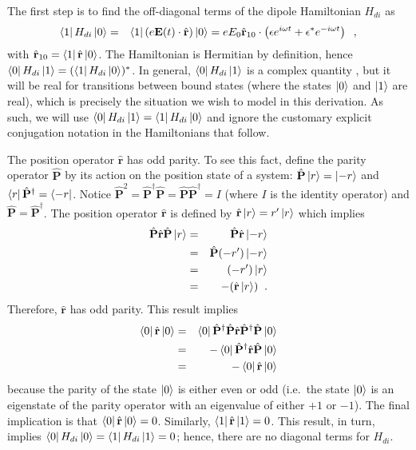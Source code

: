 The first step is to find the off-diagonal terms of the dipole Hamiltonian $H_{di}$ as
\begin{eqnarray*}
\left\langle1\right|H_{di}\left|0\right\rangle &=& \left\langle1\right|\left(e\mathbf{E}(t)\cdot\hat{\mathbf{r}}\right)\left|0\right\rangle = e E_0 \hat{\mathbf{r}}_{10}\cdot\left(\mathbf{\epsilon} e^{i\omega t} + \mathbf{\epsilon}^* e^{-i\omega t}\right)\;\;,
\end{eqnarray*}
with $\hat{\mathbf{r}}_{10} = \left\langle1\right|\hat{\mathbf{r}}\left|0\right\rangle$.  The Hamiltonian is Hermitian by definition, hence $\left\langle0\right|H_{di}\left|1\right\rangle = (\left\langle1\right|H_{di}\left|0\right\rangle)^*$. In general, $\left\langle0\right|H_{di}\left|1\right\rangle$ is a complex quantity \cite{Faisal1987}, but it will be real for transitions between bound states \cite{Loudon2000} (where the states $\left|0\right\rangle$ and $\left|1\right\rangle$ are real), which is precisely the situation we wish to model in this derivation.  As such, we will use $\left\langle0\right|H_{di}\left|1\right\rangle = \left\langle1\right|H_{di}\left|0\right\rangle$ and ignore the customary explicit conjugation notation in the Hamiltonians that follow.

The position operator $\hat{\mathbf{r}}$ has odd parity.  To see this fact, define the parity operator $\hat{\mathbf{P}}$ by its action on the position state of a system: $\hat{\mathbf{P}}\left|r\right\rangle = \left|-r\right\rangle$ and $\left\langle r\right|\hat{\mathbf{P}}^\dagger = \left\langle-r\right|$.  Notice $\hat{\mathbf{P}}^2=\hat{\mathbf{P}}^\dagger\hat{\mathbf{P}}=\hat{\mathbf{P}}\hat{\mathbf{P}}^\dagger=I$ (where $I$ is the identity operator) and $\hat{\mathbf{P}}=\hat{\mathbf{P}}^\dagger$.  The position operator $\hat{\mathbf{r}}$ is defined by $\hat{\mathbf{r}}\left|r\right\rangle=r^\prime\left|r\right\rangle$ which implies
\begin{eqnarray*}
\hat{\mathbf{P}}\hat{\mathbf{r}}\hat{\mathbf{P}}\left|r\right\rangle&=&\hat{\mathbf{P}}\hat{\mathbf{r}}\left|-r\right\rangle\\
&=&\hat{\mathbf{P}}(-r^\prime)\left|-r\right\rangle\\
&=&(-r^\prime)\left|r\right\rangle\\
&=&-(\hat{\mathbf{r}}\left|r\right\rangle)\;\;.
\end{eqnarray*}
Therefore, $\hat{\mathbf{r}}$ has odd parity.  This result implies
\begin{eqnarray*}
\left\langle0\right|\hat{\mathbf{r}}\left|0\right\rangle&=&\left\langle0\right|\hat{\mathbf{P}}^\dagger\hat{\mathbf{P}}\hat{\mathbf{r}}\hat{\mathbf{P}}^\dagger\hat{\mathbf{P}}\left|0\right\rangle\\
&=&-\left\langle0\right|\hat{\mathbf{P}}^\dagger\hat{\mathbf{r}}\hat{\mathbf{P}}\left|0\right\rangle\\
&=&-\left\langle0\right|\hat{\mathbf{r}}\left|0\right\rangle
\end{eqnarray*} 
because the parity of the state $\left|0\right\rangle$ is either even or odd (i.e.\ the state $\left|0\right\rangle$ is an eigenstate of the parity operator with an eigenvalue of either $+1$ or $-1$).  The final implication is that $\left\langle0\right|\hat{\mathbf{r}}\left|0\right\rangle=0$.  Similarly, $\left\langle1\right|\hat{\mathbf{r}}\left|1\right\rangle=0$.  This result, in turn, implies $\left\langle0\right|H_{di}\left|0\right\rangle=\left\langle1\right|H_{di}\left|1\right\rangle=0$; hence, there are no diagonal terms for $H_{di}$.

